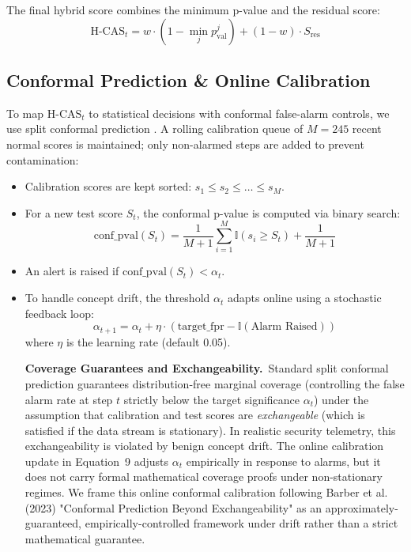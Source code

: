 The final hybrid score combines the minimum p-value and the residual score:
\begin{equation}
\text{H-CAS}_t = w \cdot (1 - \min_{j} p_{\text{val}}^j) + (1-w) \cdot S_{\text{res}}
\end{equation}

\subsection{Conformal Prediction \& Online Calibration}
To map $\text{H-CAS}_t$ to statistical decisions with conformal false-alarm controls, we use split conformal prediction \cite{shafer2008, vovk2005algorithmic, angelopoulos2021gentle}. A rolling calibration queue of $M = 245$ recent normal scores is maintained; only non-alarmed steps are added to prevent contamination:
\begin{itemize}
\item Calibration scores are kept sorted: $s_1 \leq s_2 \leq \dots \leq s_M$.
\item For a new test score $S_{t}$, the conformal p-value is computed via binary search:
\begin{equation}
\text{conf\_pval}(S_t) = \frac{1}{M+1} \sum_{i=1}^M \mathbb{I}(s_i \geq S_t) + \frac{1}{M+1}
\end{equation}
\item An alert is raised if $\text{conf\_pval}(S_t) < \alpha_t$.
\item To handle concept drift, the threshold $\alpha_t$ adapts online using a stochastic feedback loop:
\begin{equation}
\alpha_{t+1} = \alpha_t + \eta \cdot (\text{target\_fpr} - \mathbb{I}(\text{Alarm Raised}))
\end{equation}
where $\eta$ is the learning rate (default 0.05).

\textbf{Coverage Guarantees and Exchangeability.}~Standard split conformal prediction guarantees distribution-free marginal coverage (controlling the false alarm rate at step $t$ strictly below the target significance $\alpha_t$) under the assumption that calibration and test scores are \textit{exchangeable} (which is satisfied if the data stream is stationary). In realistic security telemetry, this exchangeability is violated by benign concept drift. The online calibration update in Equation~9 adjusts $\alpha_t$ empirically in response to alarms, but it does not carry formal mathematical coverage proofs under non-stationary regimes. We frame this online conformal calibration following Barber et al. (2023) "Conformal Prediction Beyond Exchangeability" as an approximately-guaranteed, empirically-controlled framework under drift rather than a strict mathematical guarantee.


\end{itemize}
